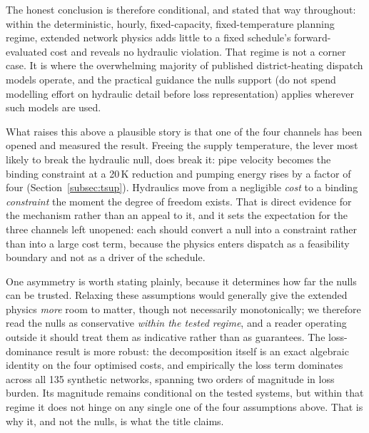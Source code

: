 The honest conclusion is therefore conditional, and stated that way throughout: within
the deterministic, hourly, fixed-capacity, fixed-temperature planning regime, extended
network physics adds little to a fixed schedule's forward-evaluated cost and reveals no
hydraulic violation. That regime is not a corner case. It is
where the overwhelming majority of published district-heating dispatch models operate, and
the practical guidance the nulls support (do not spend modelling effort on hydraulic
detail before loss representation) applies wherever such models are used.

What raises this above a plausible story is that one of the four channels has been opened
and measured the result. Freeing the supply temperature, the lever most likely to break the
hydraulic null, does break it: pipe velocity becomes the binding constraint at a 20\,K
reduction and pumping energy rises by a factor of four
(Section~\ref{subsec:tsup}). Hydraulics move from a negligible \emph{cost} to a binding
\emph{constraint} the moment the degree of freedom exists. That is direct evidence for the
mechanism rather than an appeal to it, and it sets the expectation for the three channels
left unopened: each should convert a null into a constraint rather than into a large cost
term, because the physics enters dispatch as a feasibility boundary and not as a driver of
the schedule.

One asymmetry is worth stating plainly, because it determines how far the nulls can be
trusted. Relaxing these assumptions would generally give the extended physics \emph{more} room
to matter, though not necessarily monotonically; we therefore read the nulls as conservative
\emph{within the tested regime}, and a reader operating outside it should treat them as
indicative rather than as guarantees. The loss-dominance result is more robust: the
decomposition itself is an exact algebraic identity on the four optimised costs, and
empirically the loss term dominates across all 135 synthetic networks, spanning two orders of
magnitude in loss burden. Its magnitude remains conditional on the tested systems, but within
that regime it does not hinge on any single one of the four assumptions above. That is why it,
and not the nulls, is what the title claims.
